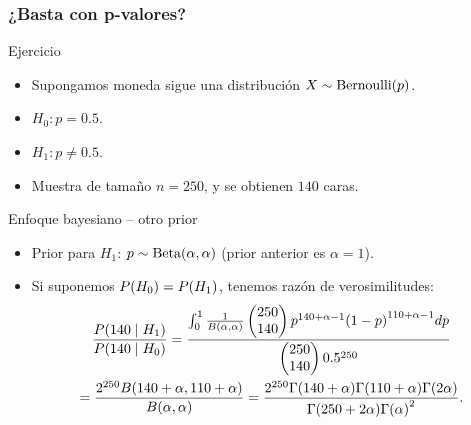 \documentclass[table]{beamer}
\begin{document}
\begin{frame}
    \frametitle{¿Basta con p-valores?}
    \begin{block}{Ejercicio}
        \begin{itemize}
            \item Supongamos moneda sigue una distribución $X \sim \bernoulli{p}$.
            \item $H_{0}: p = 0.5$.
            \item $H_{1}: p \neq 0.5$.
            \item Muestra de tamaño $n = 250$, y se obtienen $140$ caras.
        \end{itemize}
    \end{block}
    \begin{block}{Enfoque bayesiano -- otro prior}
        \begin{itemize}
            \item Prior para $H_{1}$: $p \sim \betadist{\alpha}{\alpha}$ (prior anterior es $\alpha = 1$).
            \item Si suponemos $\prob{H_{0}} = \prob{H_{1}}$, tenemos razón de verosimilitudes:
                \begin{multline*}
                    \frac{\prob{140 \mid H_{1}}}{\prob{140 \mid H_{0}}}
                    = \frac{\int_{0}^{1} \frac{1}{\betafunc{\alpha}{\alpha}} \combin{250}{140} p^{140 + \alpha - 1} \parens{1 - p}^{110 + \alpha - 1} d p}{\combin{250}{140} 0.5^{250}}
                    \\
                    = \frac{2^{250} \betafunc{140 + \alpha}{110 + \alpha}}{\betafunc{\alpha}{\alpha}}
                    = \frac{2^{250} \gammafunc{140 + \alpha} \gammafunc{110 + \alpha} \gammafunc{2 \alpha}}{\gammafunc{250 + 2 \alpha} \gammafunc{\alpha}^{2}}
                    .
                \end{multline*}
        \end{itemize}
    \end{block}
\end{frame}
\end{document}
